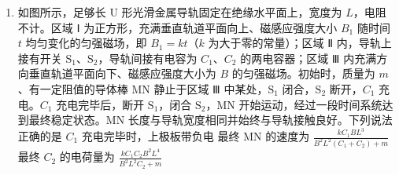 \documentclass[\gkver]{gaokaozhenti}
\begin{document}
\begin{enumerate}
{\[ v'\Delta t_{2} = v\Delta t_{2} + \frac{1}{2}a(\Delta t_{2})^{2} \]

解得 $\Delta t_{2} = 2t_{0}$

所以 $5t_{0}$ 时刻发生第三次碰撞，第三次碰前瞬间 M 的速度为 $v' = 2v$，N 的速度为 $v'' = v + a\Delta t_{2} = 3v$

对比选项中图像可知 AD 正确，BC 错误。

故选 AD。
}

\item
如图所示，足够长 U 形光滑金属导轨固定在绝缘水平面上，宽度为 $L$，电阻不计。区域 Ⅰ 为正方形，充满垂直轨道平面向上、磁感应强度大小 $B_{1}$ 随时间 $t$ 均匀变化的匀强磁场，即 $B_{1} = kt$（$k$ 为大于零的常量）；区域 Ⅱ 内，导轨上接有开关 $\text{S}_{1}$、$\text{S}_{2}$，导轨间接有电容为 $C_{1}$、$C_{2}$ 的两电容器；区域 Ⅲ 内充满方向垂直轨道平面向下、磁感应强度大小为 $B$ 的匀强磁场。初始时，质量为 $m$、有一定阻值的导体棒 MN 静止于区域 Ⅲ 中某处，$\text{S}_{1}$ 闭合，$\text{S}_{2}$ 断开，$C_{1}$ 充电。$C_{1}$ 充电完毕后，断开 $\text{S}_{1}$，闭合 $\text{S}_{2}$，MN 开始运动，经过一段时间系统达到最终稳定状态。MN 长度与导轨宽度相同并始终与导轨接触良好。下列说法正确的是 
\onepicture[w=6.12cm]{}
{$C_{1}$ 充电完毕时，上极板带负电}
{最终 MN 的速度为 $\frac{kC_{1}BL^{3}}{B^{2}L^{2}(C_{1} + C_{2}) + m}$}
{最终 $C_{2}$ 的电荷量为 $\frac{kC_{1}C_{2}B^{2}L^{4}}{B^{2}L^{2}C_{2} + m}$}
\end{enumerate}
\end{document}
